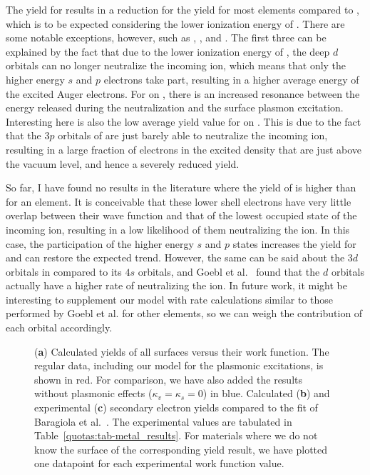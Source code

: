 \begin{refsection}
The yield for  results in a reduction for the yield for most elements 
compared to , which is to be expected considering the lower ionization 
energy of . There are some notable exceptions, however, such as , ,  and . The first three can be explained by the fact that due to the lower 
ionization energy of , the deep $d$ orbitals can no longer neutralize 
the incoming ion, which means that only the higher energy $s$ and $p$ electrons take 
part, resulting in a higher average energy of the excited Auger electrons. For  
on , there is an increased resonance between the energy released during the 
neutralization and the surface plasmon excitation.
Interesting here is also the low average yield value for  on . 
This is due to the fact that the $3p$ orbitals of  are just barely able 
to neutralize the incoming ion, resulting in a large fraction of electrons in 
the excited density that are just above the vacuum level, and hence a severely 
reduced yield. 

So far, I have found no results in the literature where the yield of  
is higher than  for an element. It is conceivable that these lower 
shell electrons have very little overlap between their wave function and that of 
the lowest occupied state of the incoming ion, resulting in a low likelihood 
of them neutralizing the ion. In this case, the participation of the higher 
energy $s$ and $p$ states increases the yield for  and can restore 
the expected trend. However, the same can be said 
about the $3d$ orbitals in  compared to its $4s$ orbitals, and Goebl 
et al.~\cite{Goebl2011} found that the $d$ orbitals actually have a higher 
rate of neutralizing the ion. In future work, it might be interesting to supplement our model 
with rate calculations similar to those performed by Goebl et al. for other 
elements, so we can weigh the contribution of each orbital accordingly. 

{
\begin{figure}[ht] 
\centering 
\captionsetup{width=\textwidth}

\caption{(\textbf{a}) Calculated yields of all surfaces versus their work function. The 
regular data, including our model for the plasmonic excitations, is shown in 
red. For comparison, we have also added the results without plasmonic effects 
($\kappa_v = \kappa_s = 0$) in blue. Calculated (\textbf{b}) and experimental (\textbf{c}) secondary electron yields compared to the fit of Baragiola et al.~\cite{Baragiola1979}. The experimental values are tabulated in Table~\ref{quotas:tab-metal_results}. For materials where we do not know the surface of the corresponding yield result, we have plotted one datapoint for each experimental work function value.} 
\label{quotas:fig-versus_workfun} 
\end{figure}
}
 

\end{refsection}
